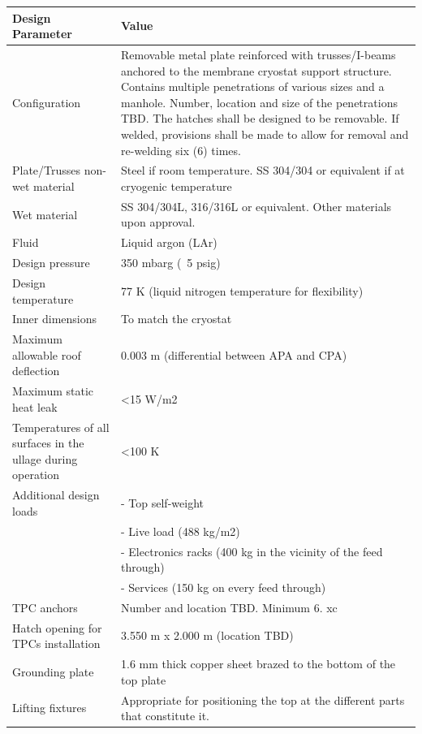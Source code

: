 \begin{table}[htpb]
\label{tbl:cryostat-top-parameters}
\centering
\begin{tabular}{|p{}|p{}|} %
\hline
 \textbf{Design Parameter} & \textbf{Value} \\ \hline
 Configuration &  Removable metal plate reinforced with trusses/I-beams anchored to the membrane cryostat support structure. Contains multiple penetrations of various sizes and a manhole. Number, location and size of the penetrations TBD. The hatches shall be designed to be removable. If welded, provisions shall be made to allow for removal and re-welding six (6) times.\\ \hline
Plate/Trusses non-wet material  &  Steel if room temperature.
SS 304/304 or equivalent if at cryogenic temperature
\\ \hline
Wet material  & SS 304/304L, 316/316L or equivalent. 
Other materials upon approval.
 \\ \hline
 Fluid & Liquid argon (LAr) \\ \hline
Design pressure  & 350 mbarg (~5 psig) \\ \hline
Design temperature  & 77 K (liquid nitrogen temperature for flexibility) \\ \hline
Inner dimensions  & To match the cryostat \\ \hline
Maximum allowable roof deflection  & 0.003 m (differential between APA and CPA) \\ \hline
Maximum static heat leak  & \textless 15 W/m2  \\ \hline
 Temperatures of all surfaces in the ullage during operation & \textless 100 K \\ \hline
Additional design loads  &  -	Top self-weight \\
 & -	Live load (488 kg/m2)\\
& -	Electronics racks (400 kg in the vicinity of the feed through)\\
& -	Services (150 kg on every feed through)
\\ \hline
TPC anchors  & %
Number and location TBD. Minimum 6.
xc \\ \hline
 Hatch opening for TPCs installation &  3.550 m x 2.000 m (location TBD)\\ \hline %
Grounding plate  &  1.6 mm thick copper sheet brazed to the bottom of the top plate\\ \hline
Lifting fixtures  & Appropriate for positioning the top at the different parts that constitute it. \\ \hline

\end{tabular}
\end{table}

